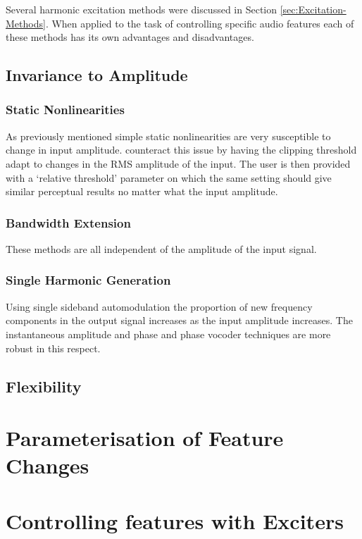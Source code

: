 
	Several harmonic excitation methods were discussed in Section \ref{sec:Excitation-Methods}. When applied to the task of controlling specific audio features each of these methods has its own advantages and disadvantages.

	\subsection{Invariance to Amplitude}
	\label{sec:FeatureControl-AmplitudeInvariance}

		\subsubsection*{Static Nonlinearities}		
			As previously mentioned simple static nonlinearities are very susceptible to change in input amplitude. \citet{deman2014adaptive} counteract this issue by having the clipping threshold adapt to changes in the RMS amplitude of the input. The user is then provided with a `relative threshold' parameter on which the same setting should give similar perceptual results no matter what the input amplitude.

		\subsubsection*{Bandwidth Extension}
			These methods are all independent of the amplitude of the input signal.
			
		\subsubsection*{Single Harmonic Generation}
			Using single sideband automodulation the proportion of new frequency components in the output signal increases as the input amplitude increases. The instantaneous amplitude and phase and phase vocoder techniques are more robust in this respect.

	\subsection{Flexibility}
	\label{sec:FeatureControl-Flexibility}

\section{Parameterisation of Feature Changes}
\label{sec:FeatureControl-Parameterisation}

\section{Controlling features with Exciters}
\label{sec:FeatureControl-Control}
